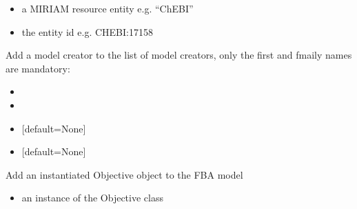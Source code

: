 \documentclass[letterpaper,10pt,english]{sphinxmanual}
\begin{document}
\begin{fulllineitems}
\begin{fulllineitems}
\begin{itemize}
\item {} 
\sphinxAtStartPar
{} a MIRIAM resource entity e.g. “ChEBI”

\item {} 
\sphinxAtStartPar
{} the entity id e.g. CHEBI:17158

\end{itemize}

\end{fulllineitems}


\begin{fulllineitems}
\label{\detokenize{modules_doc:cbmpy.CBModel.Model.addModelCreator}}
\pysigstartsignatures
{}
\pysigstopsignatures
\sphinxAtStartPar
Add a model creator to the list of model creators, only the first and fmaily names are mandatory:
\begin{itemize}
\item {} 
\sphinxAtStartPar
{}

\item {} 
\sphinxAtStartPar
{}

\item {} 
\sphinxAtStartPar
{} {[}default=None{]}

\item {} 
\sphinxAtStartPar
{}  {[}default=None{]}

\end{itemize}

\end{fulllineitems}


\begin{fulllineitems}
\label{\detokenize{modules_doc:cbmpy.CBModel.Model.addObjective}}
\pysigstartsignatures
{}
\pysigstopsignatures
\sphinxAtStartPar
Add an instantiated Objective object to the FBA model
\begin{itemize}
\item {} 
\sphinxAtStartPar
{} an instance of the Objective class


\end{itemize}
\end{fulllineitems}
\end{fulllineitems}
\end{document}
